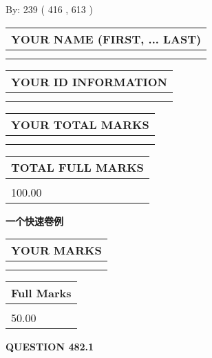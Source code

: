 \documentclass{ctexart}
\begin{document}
   
\hspace{1.0in} By: 
 239 ( 416 ,  613 )
   
   
   
   
\newpage 
\setcounter{page}{ 
   482001 } 
   
   
   
   
\noindent\begin{tabular}{|l|}
\hline
YOUR NAME (FIRST, ... LAST)  \\
\hline
 \\ 
 \\ 
\hline
\end{tabular}
\hspace{0.05in} \begin{tabular}{|l|}
\hline
 YOUR   ID   INFORMATION  \\
\hline
 \\ 
 \\ 
\hline
\end{tabular}
   
   
\vspace{0.2in}\noindent\begin{tabular}{|l|}
\hline
YOUR TOTAL MARKS  \\
\hline
 \\ 
 \\ 
\hline
\end{tabular}
\hspace{0.05in} \begin{tabular}{|l|}
\hline
TOTAL FULL MARKS  \\
\hline
 \\ 
100.00 \\
\hline
\end{tabular}
   
   
 \vspace{0.2in}
{\LARGE {\textbf{ 一个快速卷例}}}
   
   
  
\vspace{0.2in}
  
\noindent\begin{tabular}{|l|}
\hline
 YOUR MARKS  \\
\hline
 \\ 
 \\ 
\hline
\end{tabular}
\hspace{0.05in} \begin{tabular}{|l|}
\hline
 Full Marks  \\
\hline
 \\ 
50.00 \\
\hline
\end{tabular}
{\textbf{\Large{QUESTION
482.1 
}}}
  
\end{document}
